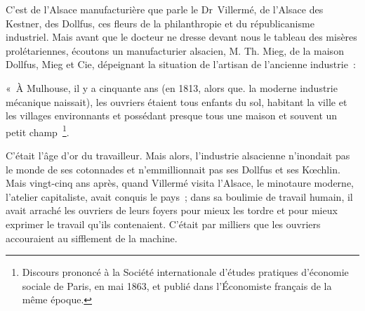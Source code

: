 \documentclass[french,twoside]{book} %
\newenvironment{quoteblock}%
  {\begin{quoting}}
  {\end{quoting}}
\newenvironment{quotebar}{%
    \def\FrameCommand{{\color{rubric!10!}\vrule width 0.5em} \hspace{0.9em}}%
    \def\OuterFrameSep{\itemsep} %
    \MakeFramed {\advance\hsize-\width \FrameRestore}
  }%
  {%
    \endMakeFramed
  }
\renewenvironment{quoteblock}%
  {%
    \savenotes
    \setstretch{0.9}
    \normalfont
    \begin{quotebar}
  }
  {%
    \end{quotebar}
    \spewnotes
  }
\begin{document}
C’est de l’Alsace manufacturière que parle le Dr Villermé, de l’Alsace des Kestner, des Dollfus, ces fleurs de la philanthropie et du républicanisme industriel. Mais avant que le docteur ne dresse devant nous le tableau des misères prolétariennes, écoutons un manufacturier alsacien, M. Th. Mieg, de la maison Dollfus, Mieg et Cie, dépeignant la situation de l’artisan de l’ancienne industrie :\par

\begin{quoteblock}
 \noindent « À Mulhouse, il y a cinquante ans (en 1813, alors que. la moderne industrie mécanique naissait), les ouvriers étaient tous enfants du sol, habitant la ville et les villages environnants et possédant presque tous une maison et souvent un petit champ \footnote{Discours prononcé à la Société internationale d’études pratiques d’économie sociale de Paris, en mai 1863, et publié dans l’Économiste français de la même époque.}.
\end{quoteblock}

\noindent C’était l’âge d’or du travailleur. Mais alors, l’industrie alsacienne n’inondait pas le monde de ses cotonnades et n’emmillionnait pas ses Dollfus et ses Kœchlin. Mais vingt-cinq ans après, quand Villermé visita l’Alsace, le minotaure moderne, l’atelier capitaliste, avait conquis le pays ; dans sa boulimie de travail humain, il avait arraché les ouvriers de leurs foyers pour mieux les tordre et pour mieux exprimer le travail qu’ils contenaient. C’était par milliers que les ouvriers accouraient au sifflement de la machine.\par
\end{document}
